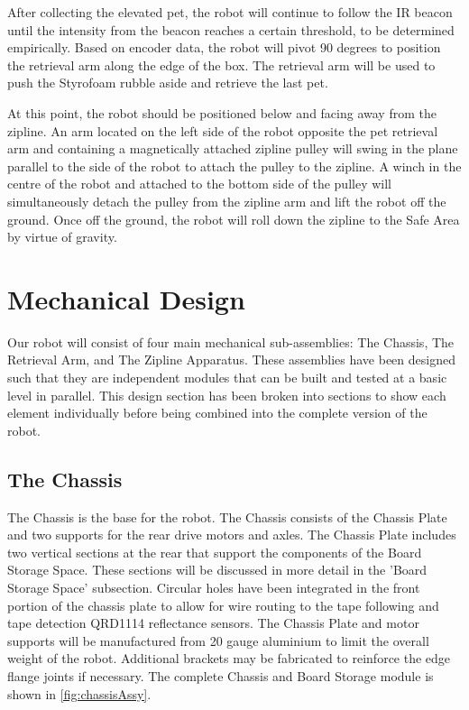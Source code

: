 \documentclass[11pt, oneside]{article} %
\begin{document}
After collecting the elevated pet, the robot will continue to follow the IR beacon until the intensity from the beacon reaches a certain threshold, to be determined empirically. Based on encoder data, the robot will pivot 90 degrees to position the retrieval arm along the edge of the box. The retrieval arm will be used to push the Styrofoam rubble aside and retrieve the last pet.

At this point, the robot should be positioned below and facing away from the zipline. An arm located on the left side of the robot opposite the pet retrieval arm and containing a magnetically attached zipline pulley will swing in the plane parallel to the side of the robot to attach the pulley to the zipline. A winch in the centre of the robot and attached to the bottom side of the pulley will simultaneously detach the pulley from the zipline arm and lift the robot off the ground. Once off the ground, the robot will roll down the zipline to the Safe Area by virtue of gravity.

\section{Mechanical Design}

Our robot will consist of four main mechanical sub-assemblies: The Chassis, The Retrieval Arm, and The Zipline Apparatus. These assemblies have been designed such that they are independent modules that can be built and tested at a basic level in parallel. This design section has been broken into sections to show each element individually before being combined into the complete version of the robot.

	\subsection{The Chassis}

	The Chassis is the base for the robot. The Chassis consists of the Chassis Plate and two supports for the rear drive motors and axles. The Chassis Plate includes two vertical sections at the rear that support the components of the Board Storage Space. These sections will be discussed in more detail in the 'Board Storage Space' subsection. Circular holes have been integrated in the front portion of the chassis plate to allow for wire routing to the tape following and tape detection QRD1114 reflectance sensors. The Chassis Plate and motor supports will be manufactured from 20 gauge aluminium to limit the overall weight of the robot. Additional brackets may be fabricated to reinforce the edge flange joints if necessary. The complete Chassis and Board Storage module is shown in \autoref{fig:chassisAssy}.
\end{document}

